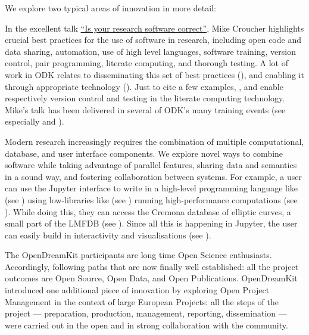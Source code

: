 \documentclass{deliverablereport}
\begin{document}
We explore two typical areas of innovation in more detail:
\begin{description}
\item[Best practices and tools for correct and reproducible research]
  In the excellent talk
  \href{https://mikecroucher.github.io/MLPM_talk/}{``Is your research
    software correct''}, Mike Croucher highlights crucial best
  practices for the use of software in research, including open code
  and data sharing, automation, use of high level languages, software
  training, version control, pair programming, literate computing, and thorough
  testing. A lot of work in ODK relates to disseminating this set of
  best practices (), and enabling it through
  appropriate technology ().  Just to cite a few
  examples, , and
   enable respectively version control
  and testing in the \Jupyter literate computing technology.
  Mike's talk has been delivered in several of ODK's many training events (see
  especially  and
  ).

\item[Multisystem architecture]
  Modern research increasingly requires the combination of multiple
  computational, database, and user interface components.
  We explore novel ways to combine software while taking
  advantage of parallel features, sharing data and
  semantics in a sound way, and fostering
  collaboration between systems.
  For example, a user can use the Jupyter interface to write
  in a high-level programming language like \Sage (see )
  using low-libraries like \Pari (see )
  running high-performance computations (see ).
  While doing this, they can access
  the Cremona database of elliptic curves, a small part of the LMFDB
  (see ).
  Since all this is happening in Jupyter, the user can easily build in
  interactivity and visualisations (see ).

\item {}

\item[Open collaborative project preparation and management] The
  OpenDreamKit participants are long time Open Science enthusiasts.
  Accordingly, following paths that are now finally well
  established: all the project outcomes are Open Source, Open Data,
  and Open Publications. OpenDreamKit introduced one additional piece of
  innovation by exploring Open Project Management in the context of
  large European Projects: all the steps of the project ---
  preparation, production, management, reporting, dissemination ---
  were carried out in the open and in strong collaboration with the
  community.


\end{description}
\end{document}
